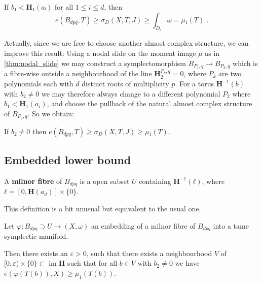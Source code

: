 \documentclass[12pt,a4paper,draft]{scrartcl}
\DeclareMathOperator{\im}{im}
\begin{document}
\begin{lemma}
  \label{thm:lower_bound_tmp}
  If $b₁ < \symbf{H}₁(aᵢ)$ for all $1 ≤ i ≤ d$, then
  \[e(B_{dpq},T) ≥ σ_D(X,T,J) ≥ ∫_{D₀} ω  = μ₁(T) \; .\]
\end{lemma}

Actually, since we are free to choose another almost complex structure, we can improve this result: 
Using a nodal slide on the moment image $μ$ as in \cref{thm:nodal_slide} we may construct a symplectomorphism $B_{P_1,q} → B_{P_2,q}$ which is a fibre-wise outside a neighbourhood of the line $\symbf{H}^{P_k,q}_2=0$, where $P_k$ are two polynomials each with $d$ distinct roots of multiplicity $p$.
For a torus $\symbf{H}^{-1}(b)$ with $b_2 ≠ 0$ we may therefore always change to a different polynomial $P_2$ where $b_1 < \symbf{H}_1(a_i)$, and choose the pullback of the natural almost complex structure of $B_{P_2,q}$. So we obtain:

\begin{lemma}
  \label{thm:lower_bound_old}
  If $b_2 ≠ 0$ then $e(B_{dpq},T) ≥ σ_D(X,T,J) ≥ μ₁(T)$.
\end{lemma}

\subsection{Embedded lower bound}



\begin{definition}
A \textbf{milnor fibre}
of $B_{dpq}$ is a open subset $U$ containing $\symbf{H}^{-1}(ℓ)$, where $ℓ = [0,\symbf{H}(a_d)] × \{0\}$. \end{definition}

\begin{remark}
  This definition is a bit unusual but equivalent to the usual one.
\end{remark}

\begin{proposition}
  \label{thm:lower_bound_embedded}
  Let $φ:B_{dpq} ⊃ U → (X,ω)$ an embedding of a milnor fibre of $B_{dpq}$ into a tame symplectic manifold.

  Then there exists an $ε>0$, such that there exists a neighbourhood $V$ of $[0,ε) × \{0\} ⊂ \im{\symbf{H}}$ such that for all $b ∈ V$ with $b_2 ≠ 0$ we have $e(φ(T(b)),X) ≥ μ_1(T(b))$.
\end{proposition}
\end{document}
